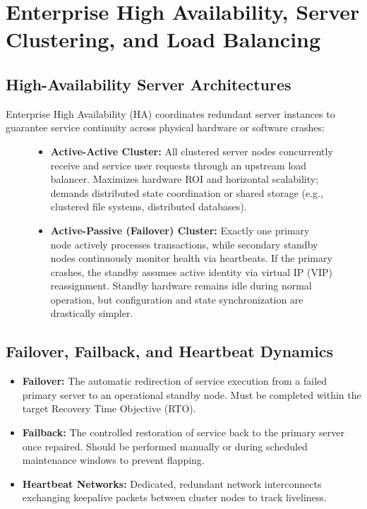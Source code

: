 \section{Enterprise High Availability, Server Clustering, and Load Balancing}
\label{sec:os_ha_clustering}

\subsection{High-Availability Server Architectures}
Enterprise High Availability (HA) coordinates redundant server instances to guarantee service continuity across physical hardware or software crashes:
\begin{figure}[htbp]
\centering
\begin{tcolorbox}[colback=codebg, colframe=primary, title=\textbf{Active-Active versus Active-Passive Topologies}]
\begin{itemize}
    \item \textbf{Active-Active Cluster:} All clustered server nodes concurrently receive and service user requests through an upstream load balancer. Maximizes hardware ROI and horizontal scalability; demands distributed state coordination or shared storage (e.g., clustered file systems, distributed databases).
    \item \textbf{Active-Passive (Failover) Cluster:} Exactly one primary node actively processes transactions, while secondary standby nodes continuously monitor health via heartbeats. If the primary crashes, the standby assumes active identity via virtual IP (VIP) reassignment. Standby hardware remains idle during normal operation, but configuration and state synchronization are drastically simpler.
\end{itemize}
\end{tcolorbox}
\end{figure}

\subsection{Failover, Failback, and Heartbeat Dynamics}
\begin{itemize}
    \item \textbf{Failover:} The automatic redirection of service execution from a failed primary server to an operational standby node. Must be completed within the target Recovery Time Objective (RTO).
    \item \textbf{Failback:} The controlled restoration of service back to the primary server once repaired. Should be performed manually or during scheduled maintenance windows to prevent flapping.
    \item \textbf{Heartbeat Networks:} Dedicated, redundant network interconnects exchanging keepalive packets between cluster nodes to track liveliness.
\end{itemize}

